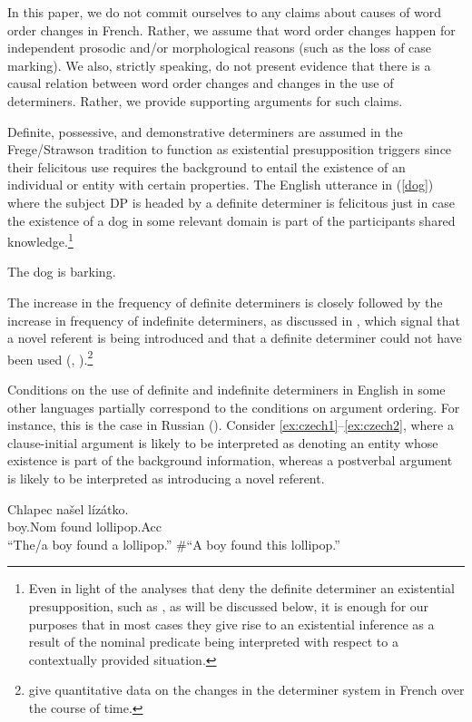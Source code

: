 \documentclass[output=paper,modfonts,nonflat]{langsci/langscibook}
\begin{document}
In this paper, we do not commit ourselves to any claims about causes of word order changes in French. Rather, we assume that word order changes happen for independent prosodic and/or morphological reasons (such as the loss of case marking). We also, strictly speaking, do not present evidence that there is a causal relation between word order changes and changes in the use of determiners. Rather, we provide supporting arguments for such claims.

Definite, possessive, and demonstrative determiners are assumed in the \linebreak Frege/Strawson tradition to function as existential presupposition triggers since their felicitous use requires the background to entail the existence of an individual or entity with certain properties. The English utterance in (\ref{dog}) where the subject DP is headed by a definite determiner is felicitous just in case the existence of a dog in some relevant domain is part of the participants shared knowledge.\footnote{Even in light of the analyses that deny the definite determiner an existential presupposition, such as \citet{CoppockBeaver:2015}, as will be discussed below, it is enough for our purposes that in most cases they give rise to an existential inference as a result of the nominal predicate being interpreted with respect to a contextually provided situation.}  

\ea \label{dog}
The dog is barking.
\z

The increase in the frequency of definite determiners is closely followed by the increase in frequency of indefinite determiners, as discussed in \citet{Carlier:2013}, which signal that a novel referent is being introduced and that a definite determiner could not have been used (\citet{Heim:1982}, \citet{Heim:1991}).\footnote{\citet{SimonenkoCarlier:review} give quantitative data on the changes in the determiner system in French over the course of time.}

Conditions on the use of definite and indefinite determiners in English in some other languages partially correspond to the conditions on argument ordering. For instance, this is the case in Russian (\citealt{Titov:2012}). Consider \ref{ex:czech1}--\ref{ex:czech2}, where a clause-initial argument is likely to be interpreted as denoting an entity whose existence is part of the background information, whereas a postverbal argument is likely to be interpreted as introducing a novel referent.

\ea\label{ex:czech1}
\gll Chlapec na\v{s}el l\'{i}z\'{a}tko.\\
boy.Nom found lollipop.Acc\\
\glt ``The/a boy found a lollipop.'' \#``A boy found this lollipop.'' 
\z
\end{document}
